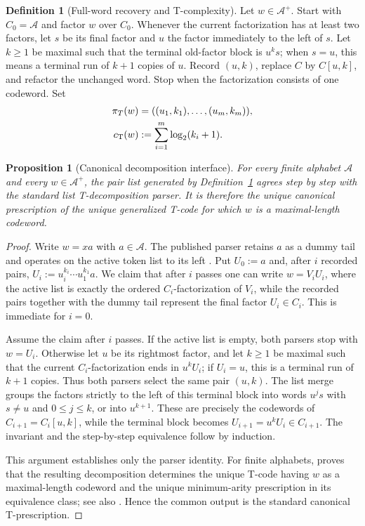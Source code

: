 \documentclass[journal]{IEEEtran}
\theoremstyle{plain}
\newtheorem{proposition}[theorem]{Proposition}
\theoremstyle{definition}
\newtheorem{definition}[theorem]{Definition}
\theoremstyle{remark}
\newcommand{\A}{\mathcal A}
\newcommand{\cT}{c_{\rm T}}
\begin{document}
\begin{definition}[Full-word recovery and T-complexity]\label{def:recovery}
Let $w\in\A^+$.  Start with $C_0=\A$ and factor $w$ over $C_0$.  Whenever the current factorization has at least two factors, let $s$ be its final factor and $u$ the factor immediately to the left of $s$.  Let $k\ge1$ be maximal such that the terminal old-factor block is $u^ks$; when $s=u$, this means a terminal run of $k+1$ copies of $u$.  Record $(u,k)$, replace $C$ by $C[u,k]$, and refactor the unchanged word.  Stop when the factorization consists of one codeword.  Set
\begin{align*}
 \pi_T(w)&=((u_1,k_1),\ldots,(u_m,k_m)),\\
 \cT(w)&:=\sum_{i=1}^m\log_2(k_i+1).
\end{align*}
\end{definition}

\begin{proposition}[Canonical decomposition interface]\label{prop:canonical-interface}
For every finite alphabet $\A$ and every $w\in\A^+$, the pair list generated by Definition~\ref{def:recovery} agrees step by step with the standard list T-decomposition parser.  It is therefore the unique canonical prescription of the unique generalized T-code for which $w$ is a maximal-length codeword.
\end{proposition}

\begin{proof}
Write $w=xa$ with $a\in\A$.  The published parser retains $a$ as a dummy tail and operates on the active token list to its left \cite[Secs.~1.1--2]{YangSpeidel2005Jucs}.  Put $U_0:=a$ and, after $i$ recorded pairs, $U_i:=u_i^{k_i}\cdots u_1^{k_1}a$.  We claim that after $i$ passes one can write $w=V_iU_i$, where the active list is exactly the ordered $C_i$-factorization of $V_i$, while the recorded pairs together with the dummy tail represent the final factor $U_i\in C_i$.  This is immediate for $i=0$.

Assume the claim after $i$ passes.  If the active list is empty, both parsers stop with $w=U_i$.  Otherwise let $u$ be its rightmost factor, and let $k\ge1$ be maximal such that the current $C_i$-factorization ends in $u^kU_i$; if $U_i=u$, this is a terminal run of $k+1$ copies.  Thus both parsers select the same pair $(u,k)$.  The list merge groups the factors strictly to the left of this terminal block into words $u^js$ with $s\ne u$ and $0\le j\le k$, or into $u^{k+1}$.  These are precisely the codewords of $C_{i+1}=C_i[u,k]$, while the terminal block becomes $U_{i+1}=u^kU_i\in C_{i+1}$.  The invariant and the step-by-step equivalence follow by induction.

This argument establishes only the parser identity.  For finite alphabets, \cite[Theorem~6.1 and Corollaries~6.3, 6.4, and~6.8]{NicolescuTitchener1998} proves that the resulting decomposition determines the unique T-code having $w$ as a maximal-length codeword and the unique minimum-arity prescription in its equivalence class; see also \cite[pp.~446--450]{TitchenerEtAl2005}.  Hence the common output is the standard canonical T-prescription.
\end{proof}
\end{document}
